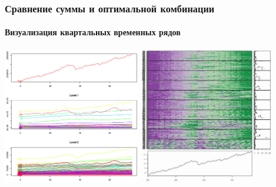 \documentclass[c, dvipsnames]{beamer}  %
\begin{document}
\begin{frame}[shrink=5]
\frametitle{Сравнение суммы и оптимальной комбинации } 
\framesubtitle{Визуализация  квартальных временных рядов   }

\vfil
\hfil\hfil\includegraphics[height=6cm]{screenshot062}\hfil\hfil
\includegraphics[height=6cm]{screenshot063}\newline
\null\hfil\hfil{}
\hfil\hfil{}
\end{frame}
\end{document}
